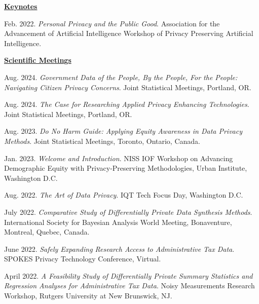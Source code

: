 \underline{\textbf{\large Keynotes}}\normalsize
\vspace{6pt}
\begin{etaremune}[topsep=0pt, itemsep=4pt, partopsep=0pt, parsep=0pt]
    \item Feb. 2022. \textit{Personal Privacy and the Public Good}. Association for the Advancement of Artificial Intelligence Workshop of Privacy Preserving Artificial Intelligence.
    
\vspace{6pt}
\hspace{-0.30in}\underline{\textbf{\large Scientific Meetings}}\normalsize
    \item Aug. 2024. \textit{Government Data of the People, By the People, For the People: Navigating Citizen Privacy Concerns}. Joint Statistical Meetings, Portland, OR.

    \item Aug. 2024. \textit{The Case for Researching Applied Privacy Enhancing Technologies}. Joint Statistical Meetings, Portland, OR.

    \item Aug. 2023. \textit{Do No Harm Guide: Applying Equity Awareness in Data Privacy Methods}. Joint Statistical Meetings, Toronto, Ontario, Canada.
    
    \item Jan. 2023. \textit{Welcome and Introduction}. NISS IOF Workshop on Advancing Demographic Equity with Privacy-Preserving Methodologies, Urban Institute, Washington D.C.
    
    \item Aug. 2022. \textit{The Art of Data Privacy}. IQT Tech Focus Day, Washington D.C.
    
    \item July 2022. \textit{Comparative Study of Differentially Private Data Synthesis Methods}. International Society for Bayesian Analysis World Meeting, Bonaventure, Montreal, Quebec, Canada.
    
    \item June 2022. \textit{Safely Expanding Research Access to Administrative Tax Data}. SPOKES Privacy Technology Conference, Virtual.
    
    \item April 2022. \textit{A Feasibility Study of Differentially Private Summary Statistics and Regression Analyses for Administrative Tax Data}. Noisy Measurements Research Workshop, Rutgers University at New Brunswick, NJ.
    

\end{etaremune}
